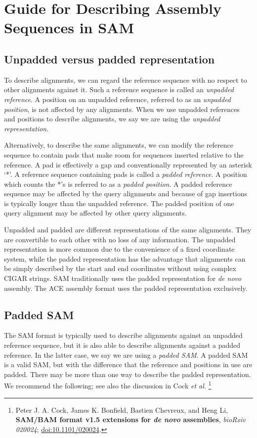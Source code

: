 \documentclass[10pt]{article}
\begin{document}
\section{Guide for Describing Assembly Sequences in SAM}

\subsection{Unpadded versus padded representation}

To describe alignments, we can regard the reference sequence with no respect to
other alignments against it.  Such a reference sequence is called an
\emph{unpadded reference}. A position on an unpadded reference, referred to
as an \emph{unpadded position}, is not affected by any alignments. When we use
unpadded references and positions to describe alignments, we say we are using
the \emph{unpadded representation}.

Alternatively, to describe the same alignments, we can modify the reference
sequence to contain pads that make room for sequences inserted relative to the
reference. A pad is effectively a gap and conventionally represented by an
asterisk `*'.  A reference sequence containing pads is called a \emph{padded
reference}. A position which counts the *'s is referred to as a \emph{padded
position}. A padded reference sequence may be affected by the query alignments
and because of gap insertions is typically longer than the unpadded reference.
The padded position of one query alignment may be affected by other query
alignments.

Unpadded and padded are different representations of the same alignments. They
are convertible to each other with no loss of any information. The unpadded
representation is more common due to the convenience of a fixed coordinate system,
while the padded representation has the advantage that alignments can be simply
described by the start and end coordinates without using complex CIGAR strings.
SAM traditionally uses the padded representation for {\it de novo} assembly.
The ACE assembly format uses the padded representation exclusively.

\subsection{Padded SAM}\label{sec:padded-sam}

The SAM format is typically used to describe alignments against an unpadded
reference sequence, but it is also able to describe alignments against a padded
reference. In the latter case, we say we are using a \emph{padded SAM}. A padded
SAM is a valid SAM, but with the difference that the reference and positions in
use are padded. There may be more than one way to describe the padded
representation.
We recommend the following; see also the discussion in Cock {\it et al.}%
\footnote{Peter J. A. Cock, James K. Bonfield, Bastien Chevreux, and Heng Li,
{\bf SAM/BAM format v1.5 extensions for \emph{de novo} assemblies},
{\sl bioRxiv 020024};
\href{http://dx.doi.org/10.1101/020024}{doi:10.1101/020024}.}
\end{document}
